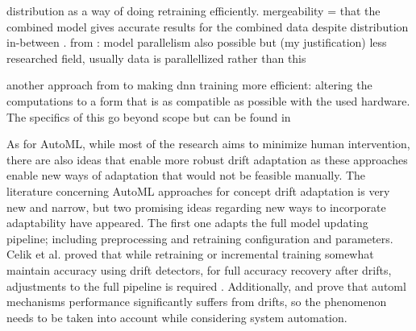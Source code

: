 distribution as a way of doing retraining efficiently. mergeability =  that the combined model gives accurate results for the combined data despite distribution in-between \cite{bifet_machine_2017}. from \cite{ben-nun_demystifying_2019}: model parallelism also possible but (my justification) less researched field, usually data is parallellized rather than this

another approach from \cite{ben-nun_demystifying_2019} to making dnn training more efficient: altering the computations to a form that is as compatible as possible with the used hardware. The specifics of this go beyond scope but can be found in \cite{ben-nun_demystifying_2019}



As for AutoML, while most of the research aims to minimize human intervention, there are also ideas that enable more robust drift adaptation as these approaches enable new ways of adaptation that would not be feasible manually. The literature concerning AutoML approaches for concept drift adaptation is very new and narrow, but two promising ideas regarding new ways to incorporate adaptability have appeared. The first one adapts the full model updating pipeline; including preprocessing and retraining configuration and parameters. Celik et al. proved that while retraining or incremental training somewhat maintain accuracy using drift detectors, for full accuracy recovery after drifts, adjustments to the full pipeline is required \cite{celik_adaptation_2021}. Additionally, \cite{celik_adaptation_2021} and \cite{madrid_towards_2019} prove that automl mechanisms performance significantly suffers from drifts, so the phenomenon needs to be taken into account while considering system automation. 


